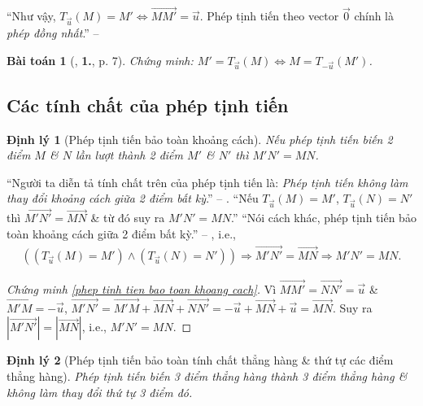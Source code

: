 \documentclass[oneside]{book}
\numberwithin{equation}{section}
\newtheorem{baitoan}{Bài toán}[section]
\newtheorem{dinhly}{Định lý}[section]
\begin{document}
``Như vậy, $T_{\vec{u}}(M) = M'\Leftrightarrow\overrightarrow{MM'} = \vec{u}$. Phép tịnh tiến theo vector $\vec{0}$ chính là \textit{phép đồng nhất}.'' -- \cite[p. 5]{SGK_Toan_11_hinh_hoc_co_ban}

\begin{baitoan}[\cite{SGK_Toan_11_dai_so_giai_tich_co_ban}, \textbf{1.}, p. 7]
	\label{prob:phep tinh tien}
	Chứng minh: $M' = T_{\vec{u}}(M)\Leftrightarrow M = T_{-\vec{u}}(M')$.
\end{baitoan}

\subsection{Các tính chất của phép tịnh tiến}

\begin{dinhly}[Phép tịnh tiến bảo toàn khoảng cách]
	\label{thm:phep tinh tien bao toan khoang cach}
	Nếu phép tịnh tiến biến 2 điểm $M$ \& $N$ lần lượt thành 2 điểm $M'$ \& $N'$ thì $M'N' = MN$.
\end{dinhly}
``Người ta diễn tả tính chất trên của phép tịnh tiến là: \textit{Phép tịnh tiến không làm thay đổi khoảng cách giữa 2 điểm bất kỳ}.'' -- \cite[p. 6]{SGK_Toan_11_hinh_hoc_nang_cao}. ``Nếu $T_{\vec{u}}(M) = M'$, $T_{\vec{u}}(N) = N'$ thì $\overrightarrow{M'N'} = \overrightarrow{MN}$ \& từ đó suy ra $M'N' = MN$.'' ``Nói cách khác, phép tịnh tiến bảo toàn khoảng cách giữa 2 điểm bất kỳ.'' -- \cite[p. 6]{SGK_Toan_11_hinh_hoc_co_ban}, i.e.,
\begin{align}
	\label{phep tinh tien bao toan khoang cach}
	((T_{\vec{u}}(M) = M')\land(T_{\vec{u}}(N) = N'))\Rightarrow\overrightarrow{M'N'} = \overrightarrow{MN}\Rightarrow M'N' = MN.
\end{align}

\begin{proof}[Chứng minh \eqref{phep tinh tien bao toan khoang cach}]
	Vì $\overrightarrow{MM'} = \overrightarrow{NN'} = \vec{u}$ \& $\overrightarrow{M'M} = -\vec{u}$, $\overrightarrow{M'N'} = \overrightarrow{M'M} + \overrightarrow{MN} + \overrightarrow{NN'} = -\vec{u} + \overrightarrow{MN} + \vec{u} = \overrightarrow{MN}$. Suy ra $|\overrightarrow{M'N'}| = |\overrightarrow{MN}|$, i.e., $M'N' = MN$.
\end{proof}

\begin{dinhly}[Phép tịnh tiến bảo toàn tính chất thẳng hàng \& thứ tự các điểm thẳng hàng]
	Phép tịnh tiến biến 3 điểm thẳng hàng thành 3 điểm thẳng hàng \& không làm thay đổi thứ tự 3 điểm đó.
\end{dinhly}
\end{document}
